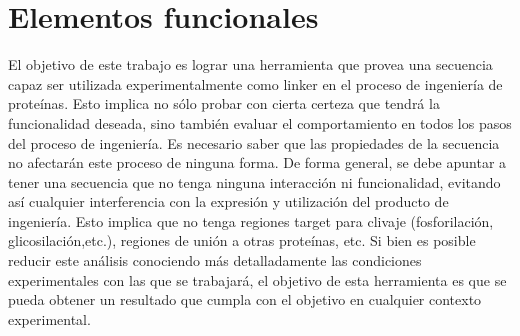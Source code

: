 






























































\section{Elementos funcionales}



El objetivo de este trabajo es lograr una herramienta que provea una secuencia capaz ser utilizada experimentalmente como linker en el proceso de ingeniería de proteínas. 
Esto implica no sólo probar con cierta certeza que tendrá la funcionalidad deseada, sino también evaluar el comportamiento en todos los pasos del proceso de ingeniería. 
Es necesario saber que las propiedades de la secuencia no afectarán este proceso de ninguna forma.
De forma general, se debe apuntar a tener una secuencia que no tenga ninguna interacción ni funcionalidad, evitando así cualquier interferencia con la expresión y utilización del producto 
de ingeniería. Esto implica que no tenga regiones target para clivaje (fosforilación, glicosilación,etc.), regiones de unión a otras proteínas, etc.
Si bien es posible reducir este análisis conociendo más detalladamente las condiciones experimentales con las que se trabajará, el objetivo de esta herramienta es que se pueda obtener 
un resultado que cumpla con el objetivo en cualquier contexto experimental. 

